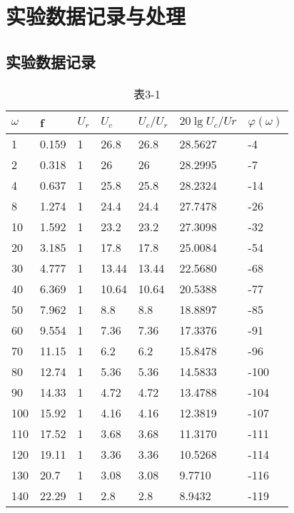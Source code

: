 \documentclass[UTF8,a4paper,10pt]{ctexart}
\begin{document}
	\section{实验数据记录与处理}
	\subsection{实验数据记录}
	\begin{table}[h]
		\caption{表3-1}
		\centering
		\begin{tabular}{|l|l|l|l|l|l|l|}
			\hline
			$\omega$  & f     & $U_{r}$ & $U_{c}$    & $U_{c}/U_{r}$ & $20\lg U_{c}/U{r}$    & $\varphi(\omega)$ \\ \hline
			1   & 0.159 & 1  & 26.8  & 26.8  & 28.5627   & -4     \\ \hline
			2   & 0.318 & 1  & 26    & 26    & 28.2995   & -7     \\ \hline
			4   & 0.637 & 1  & 25.8  & 25.8  & 28.2324   & -14    \\ \hline
			8   & 1.274 & 1  & 24.4  & 24.4  & 27.7478   & -26    \\ \hline
			10  & 1.592 & 1  & 23.2  & 23.2  & 27.3098   & -32    \\ \hline
			20  & 3.185 & 1  & 17.8  & 17.8  & 25.0084   & -54    \\ \hline
			30  & 4.777 & 1  & 13.44 & 13.44 & 22.5680   & -68    \\ \hline
			40  & 6.369 & 1  & 10.64 & 10.64 & 20.5388   & -77    \\ \hline
			50  & 7.962 & 1  & 8.8   & 8.8   & 18.8897   & -85    \\ \hline
			60  & 9.554 & 1  & 7.36  & 7.36  & 17.3376   & -91    \\ \hline
			70  & 11.15 & 1  & 6.2   & 6.2   & 15.8478   & -96    \\ \hline
			80  & 12.74 & 1  & 5.36  & 5.36  & 14.5833   & -100   \\ \hline
			90  & 14.33 & 1  & 4.72  & 4.72  & 13.4788   & -104   \\ \hline
			100 & 15.92 & 1  & 4.16  & 4.16  & 12.3819   & -107   \\ \hline
			110 & 17.52 & 1  & 3.68  & 3.68  & 11.3170   & -111   \\ \hline
			120 & 19.11 & 1  & 3.36  & 3.36  & 10.5268   & -114   \\ \hline
			130 & 20.7  & 1  & 3.08  & 3.08  & 9.7710    & -116   \\ \hline
			140 & 22.29 & 1  & 2.8   & 2.8   & 8.9432    & -119   \\ \hline

\end{tabular}
\end{table}
\end{document}
